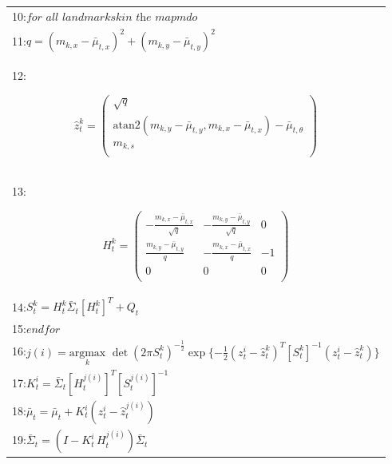 \documentclass[10pt,a4paper]{article}
\begin{document}
\begin{table}[H]
\begin{center}
\begin{tabular}{|l|}
10:\hspace{10mm}$\textit{for all landmarks} k \textit{in the map} m \textit{do}$\\
11:\hspace{15mm}$q=(m_{k,x}-\bar{\mu}_{t,x})^2+(m_{k,y}-\bar{\mu}_{t,y})^2$\\
12:\hspace{15mm}
\begin{minipage}{0.2\textwidth}
\begin{equation*}
\hat{z}_t^k=
\left(\begin{array}{c}
\sqrt{q}\\
\text{atan}2(m_{k,y}-\bar{\mu}_{t,y},m_{k,x}-\bar{\mu}_{t,x})-\bar{\mu}_{t,\theta}\\
m_{k,s}\\
\end{array}\right)
\end{equation*}
\end{minipage}\\
13:\hspace{15mm}
\begin{minipage}{0.2\textwidth}
\begin{equation*}
H_t^k=
\left(\begin{array}{ccc}
-\frac{m_{k,x}-\bar{\mu}_{t,x}}{\sqrt{q}}&-\frac{m_{k,y}-\bar{\mu}_{t,y}}{\sqrt{q}}&0\\
\frac{m_{k,y}-\bar{\mu}_{t,y}}{q}&-\frac{m_{k,x}-\bar{\mu}_{t,x}}{q}&-1\\
0&0&0\\
\end{array}\right)
\end{equation*}
\end{minipage}\\
14:\hspace{15mm}$S_t^k=H_t^k\bar{\varSigma}_t[H_t^k]^T+Q_t$\\
15:\hspace{10mm}$\textit{endfor}$\\
16:\hspace{10mm}$j(i)=\underset{k}{\text{argmax}}\,\,\det(2\pi S_t^k)^{-\frac{1}{2}}\exp\{-\frac{1}{2}(z_t^i-\hat{z}_t^k)^T[S_t^k]^{-1}(z_t^i-\hat{z}_t^k)\}$\\
17:\hspace{10mm}$K_t^i=\bar{\varSigma}_t[H_t^{j(i)}]^T[S_t^{j(i)}]^{-1}$\\
18:\hspace{10mm}$\bar{\mu}_t=\bar{\mu}_t+K_t^i(z_t^i-\hat{z}_t^{j(i)})$\\
19:\hspace{10mm}$\bar{\varSigma}_t=(I-K_t^i\,H_t^{j(i)})\bar{\varSigma}_t$\\

\end{tabular}
\end{center}
\end{table}
\end{document}
